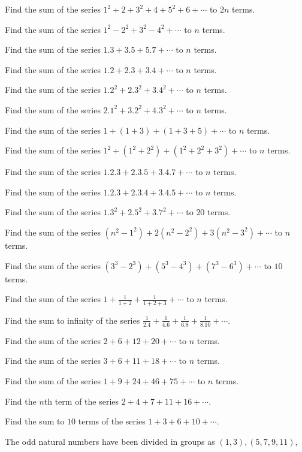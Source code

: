 \item Find the sum of the series $1^2 + 2 + 3^2 + 4 + 5^2 + 6 + \cdots$ to $2n$ terms.
\item Find the sum of the series $1^2 - 2^2 + 3^2 - 4^2 + \cdots$ to $n$ terms.
\item Find the sum of the series $1.3 + 3.5 + 5.7 + \cdots$ to $n$ terms.
\item Find the sum of the series $1.2 + 2.3 + 3.4 + \cdots$ to $n$ terms.
\item Find the sum of the series $1.2^2 + 2.3^2 + 3.4^2 + \cdots$ to $n$ terms.
\item Find the sum of the series $2.1^2 + 3.2^2 + 4.3^2 + \cdots$ to $n$ terms.
\item Find the sum of the series $1 + (1 + 3) + (1 + 3 + 5) + \cdots$ to $n$ terms.
\item Find the sum of the series $1^2 + (1^2 + 2^2) + (1^2 + 2^2 + 3^2) + \cdots$ to $n$ terms.
\item Find the sum of the series $1.2.3 + 2.3.5 + 3.4.7 + \cdots$ to $n$ terms.
\item Find the sum of the series $1.2.3 + 2.3.4 + 3.4.5 + \cdots$ to $n$ terms.
\item Find the sum of the series $1.3^2 + 2.5^2 + 3.7^2 + \cdots$ to $20$ terms.
\item Find the sum of the series $(n^2 - 1^2) + 2(n^2 - 2^2) + 3(n^2 - 3^2) + \cdots$ to $n$ terms.
\item Find the sum of the series $(3^3 - 2^3) + (5^3 - 4^3) + (7^3 - 6^3) + \cdots$ to $10$ terms.
\item Find the sum of the series $1 + \frac{1}{1+2} + \frac{1}{1 + 2 + 3} + \cdots$ to $n$ terms.
\item Find the sum to infinity of the series $\frac{1}{2.4} + \frac{1}{4.6} + \frac{1}{6.8} + \frac{1}{8.10} + \cdots$.
\item Find the sum of the series $2 + 6 + 12 + 20 + \cdots$ to $n$ terms.
\item Find the sum of the series $3 + 6 + 11 + 18 + \cdots$ to $n$ terms.
\item Find the sum of the series $1 + 9 + 24 + 46 + 75 + \cdots$ to $n$ terms.
\item Find the $n$th term of the series $2 + 4 + 7 + 11 + 16 + \cdots$.
\item Find the sum to $10$ terms of the series $1 + 3 + 6 + 10 + \cdots$.
\item The odd natural numbers have been divided in groups as $(1, 3), (5, 7, 9, 11)$,

